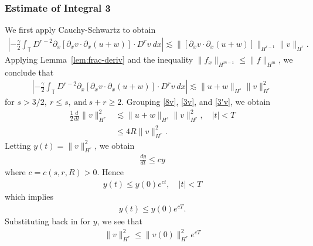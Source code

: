 \documentclass[12pt,reqno]{amsart}
\numberwithin{equation}{section}  %
\numberwithin{figure}{section}
\newcommand{\ci}{\mathbb{T}}
\newcommand{\p}{\partial}
\begin{document}
\subsubsection{Estimate of Integral 3} We first apply
Cauchy-Schwartz to obtain
%
%
\begin{equation*}
\begin{split}
\left | - \frac{\gamma}{2} \int_{\ci} D^{r 
-2} \p_x [ \p_x v
\cdot \p_x (u+w)]\cdot D^r v \ dx \right | 
\lesssim 
\|[\p_x v \cdot \p_x (u+w)] \|_{H^{r -1}}
\|v\|_{H^r}.
\end{split}
\end{equation*}
%
%
Applying Lemma~\ref{lem:frac-deriv} and the inequality $\| f_{x}
\|_{H^{m-1}} \le \| f \|_{H^{m}}$,  we conclude that
%
\begin{equation}
\begin{split}
\left | - \frac{\gamma}{2} \int_{\ci} D^{r 
-2} \p_x [ \p_x v
\cdot \p_x (u+w)]\cdot D^r v \ dx \right | 
\lesssim \|u+w \|_{H^{s}}
\|v\|_{H^r}^2
\label{3'v}
\end{split}
\end{equation}
%
%
for $s > 3/2, \ r \le s, \ \text{and} \ s + r \ge 2$.
%
%
%
%
Grouping \eqref{8v}, \eqref{3v}, and \eqref{3'v}, we obtain
%
%
\begin{equation*}
\begin{split}
\frac{1}{2} \frac{d}{dt}
\|v\|_{H^r}^2
& \lesssim \|u+w\|_{H^s}
\|v\|_{H^r}^2, \quad | t | < T
\\
& \le 4R \| v \|_{H^{r}}^{2}.
\label{9v}
\end{split}
\end{equation*}
%
%
%
%
%
Letting $y(t) = \| v \|^{2}_{H^{r}}$, we obtain
%
%
%
\begin{equation*}
\begin{split}
\frac{dy}{dt} \le cy
\end{split}
\end{equation*}
%
where $c = c(s, r, R) > 0$. Hence
%
%
\begin{equation*}
\begin{split}
y(t) \le y(0) e^{ct}, \quad | t | < T
\end{split}
\end{equation*}
%
%
which implies
%
%
\begin{equation*}
\begin{split}
y(t) \le y(0) e^{cT}.
\end{split}
\end{equation*}
%
%
Substituting back in for $y$, we see that
%
%
\begin{equation*}
\begin{split}
\| v \|_{H^{r}}^{2} \le \| v(0) \|^{2}_{H^{r}} e^{cT}
\end{split}
\end{equation*}
\end{document}
